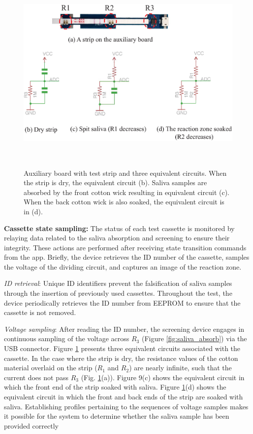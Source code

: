 \begin{figure}[ht]
\begin{center}
\includegraphics[height=10cm]{image/ket/equivalent_circuit.eps}
\caption{Auxiliary board with test strip and three equivalent circuits. When the strip is dry, the equivalent circuit (b). Saliva samples are absorbed by the front cotton wick resulting in equivalent circuit (c). When the back cotton wick is also soaked, the equivalent circuit is in (d).}
\label{fig:equivalent_circuit}
\end{center}
\end{figure}

\textbf{Cassette state sampling:}
\newline
The status of each test cassette is monitored by relaying data related to the saliva absorption and screening to ensure their integrity. These actions are performed after receiving state transition commands from the app. Briefly, the device retrieves the ID number of the cassette, samples the voltage of the dividing circuit, and captures an image of the reaction zone.

\emph{ID retrieval}:  Unique ID identifiers prevent the falsification of saliva samples through the insertion of previously used cassettes. Throughout the test, the device periodically retrieves the ID number from EEPROM to ensure that the cassette is not removed.

\emph{Voltage sampling}: After reading the ID number, the screening device engages in continuous sampling of the voltage across $R_3$ (Figure \ref{fig:saliva_absorb}) via the USB connector. Figure \ref{fig:equivalent_circuit} presents three equivalent circuits associated with the cassette. In the case where the strip is dry, the resistance values of the cotton material overlaid on the strip ($R_1$ and $R_2$) are nearly infinite, such that the current does not pass $R_3$ (Fig. \ref{fig:equivalent_circuit}(a)). Figure 9(c) shows the equivalent circuit in which the front end of the strip soaked with saliva. Figure \ref{fig:equivalent_circuit}(d) shows the equivalent circuit in which the front and back ends of the strip are soaked with saliva. Establishing profiles pertaining to the sequences of voltage samples makes it possible for the system to determine whether the saliva sample has been provided correctly


